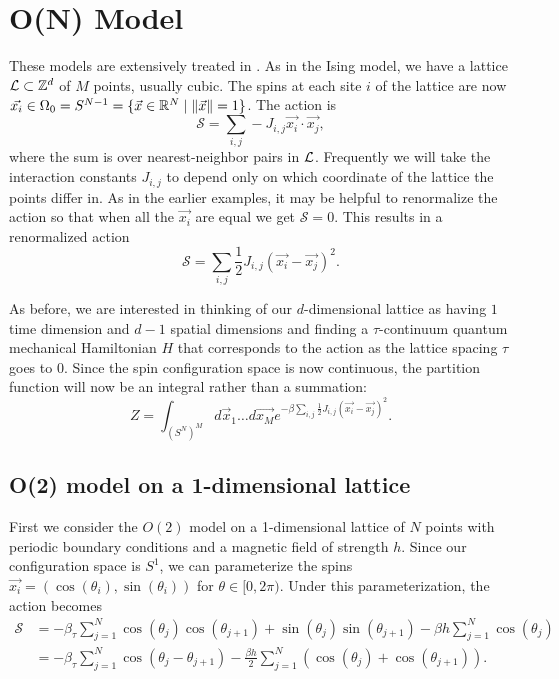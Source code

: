 \documentclass[11pt,reqno]{amsart}
\numberwithin{equation}{section}
\begin{document}
	\section{O(N) Model}
	
	These models are extensively treated in \cite{FradkinSusskind78,HamerKogutSusskind79,KogutGaugeSummary}. 
	As in the Ising model, we have a lattice $\mathcal{L} \subset \mathbb{Z}^d$ of $M$ points, usually cubic. 
	The spins at each site $i$ of the lattice are now $\vec{x_i} \in \Omega_0=S^{N-1} = \{\vec{x} \in \mathbb{R}^{N} \mid \|\vec{x}\|=1 \}$. 
	The action is
	\[\mathcal{S}=\sum_{i,j} -J_{i,j}\vec{x_i}\cdot\vec{x_j}, \] where the sum is over nearest-neighbor pairs in $\mathcal{L}$.
	Frequently we will take the interaction constants $J_{i,j}$ to depend only on which coordinate of the lattice the points differ in.
	As in the earlier examples, it may be helpful to renormalize the action so that when all the $\vec{x_i}$ are equal we get $\mathcal{S}=0$. 
	This results in a renormalized action
	\[\mathcal{S}=\sum_{i,j}\frac{1}{2} J_{i,j}(\vec{x_i}-\vec{x_j})^2. \]
	
	As before, we are interested in thinking of our $d$-dimensional lattice as having $1$ time dimension and $d-1$ spatial dimensions and finding a $\tau$-continuum quantum mechanical Hamiltonian $H$ that corresponds to the action as the lattice spacing $\tau$ goes to $0$.
	Since the spin configuration space is now continuous, the partition function will now be an integral rather than a summation:
	\[ Z=\int_{(S^N)^M} d\vec{x}_1\ldots d\vec{x_M} e^{-\beta\sum_{i,j}\frac{1}{2} J_{i,j}(\vec{x_i}-\vec{x_j})^2}. \]
	
	\subsection{O(2) model on a 1-dimensional lattice}
	
	First we consider the $O(2)$ model on a 1-dimensional lattice of $N$ points with periodic boundary conditions and a magnetic field of strength $h$.
	Since our configuration space is $S^1$, we can parameterize the spins $\vec{x_i}=(\cos(\theta_i),\sin(\theta_i))$ for $\theta \in [0,2\pi)$. 
	Under this parameterization, the action becomes
	\begin{align*}
		 \mathcal{S} &= -\beta_\tau \sum_{j=1}^N \cos(\theta_j)\cos(\theta_{j+1})+\sin(\theta_j)\sin(\theta_{j+1}) - \beta h  \sum_{j=1}^N \cos(\theta_j)\\
			&=  - \beta_\tau \sum_{j=1}^N \cos(\theta_j-\theta_{j+1}) - \frac{\beta h}{2}  \sum_{j=1}^N \left(\cos(\theta_j)+\cos(\theta_{j+1})\right). 
	\end{align*}
	
\end{document}
